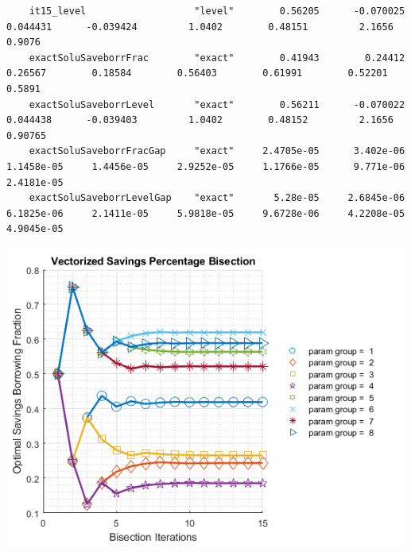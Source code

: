 \documentclass[
]{book}
\begin{document}
\begin{verbatim}
    it15_level                   "level"        0.56205      -0.070025       0.044431      -0.039424         1.0402        0.48151         2.1656         0.9076
    exactSoluSaveborrFrac        "exact"        0.41943        0.24412        0.26567        0.18584        0.56403        0.61991        0.52201         0.5891
    exactSoluSaveborrLevel       "exact"        0.56211      -0.070022       0.044438      -0.039403         1.0402        0.48152         2.1656        0.90765
    exactSoluSaveborrFracGap     "exact"     2.4705e-05      3.402e-06     1.1458e-05     1.4456e-05     2.9252e-05     1.1766e-05      9.771e-06     2.4181e-05
    exactSoluSaveborrLevelGap    "exact"       5.28e-05     2.6845e-06     6.1825e-06     2.1411e-05     5.9818e-05     9.6728e-06     4.2208e-05     4.9045e-05
\end{verbatim}

\includegraphics[width=5.20833in,height=\textheight]{img/fx_optim_bisec_savezrone_images/figure_0.png}
\end{document}
